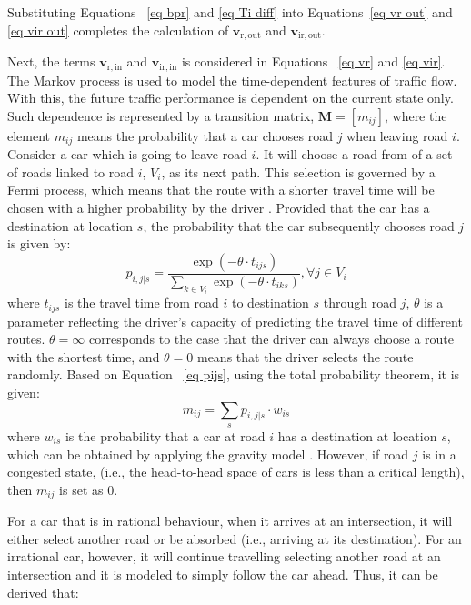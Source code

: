 \documentclass[review,11pt,nonatbib]{elsarticle}
\begin{document}
Substituting Equations ~\eqref{eq bpr} and \eqref{eq Ti diff} into Equations~\eqref{eq vr out} and \eqref{eq vir out} completes the calculation of $\mathbf{v}_{\mathrm{r,out}}$ and $\mathbf{v}_{\mathrm{ir,out}}$.
\par Next, the terms $\mathbf{v}_{\mathrm{r,in}}$ and $\mathbf{v}_{\mathrm{ir,in}}$ is considered in Equations ~\eqref{eq vr} and \eqref{eq vir}. The Markov process is used to model the time-dependent features of traffic flow. With this, the future traffic performance is dependent on the current state only. Such dependence is represented by a transition matrix, $\mathbf{M}=[m_{ij}]$, where the element $m_{ij}$ means the probability that a car chooses road $j$ when leaving road $i$.  Consider a car which is going to leave road $i$. It will choose a road from of a set of roads linked to road $i$, $V_i$, as its next path. This selection is governed by a Fermi process, which means that the route with a shorter travel time will be chosen with a higher probability by the driver \citep{lam1999stochastic,wu2010universality}. Provided that the car has a destination at location $s$, the probability that the car subsequently chooses road $j$ is given by:
\begin{equation}\label{eq pijs}
p_{i,j|s}=\frac{\exp(-\theta \cdot t_{ijs})}{\sum_{k\in V_i}\exp(-\theta\cdot t_{iks})}, \forall j\in V_i
\end{equation}
where $t_{ijs}$ is the travel time from road $i$ to destination $s$ through road $j$, $\theta$ is a parameter reflecting the driver's capacity of predicting the travel time of different routes. $\theta=\infty$ corresponds to the case that the driver can always choose a route with the shortest time, and $\theta=0$ means that the driver selects the route randomly. Based on Equation ~\eqref{eq pijs}, using the total probability theorem, it is given:
\begin{equation}\label{eq mij}
m_{ij}=\sum_{s} p_{i,j|s}\cdot w_{is}
\end{equation}
where $w_{is}$ is the probability that a car at road $i$ has a destination at location $s$, which can be obtained by applying the gravity model \citep{moriarty2007modeling,chang2012post}. However, if road $j$ is in a congested state, (i.e., the head-to-head space of cars is less than a critical length), then $m_{ij}$ is set as 0.
\par For a car that is in rational behaviour, when it arrives at an intersection, it will either select another road or be absorbed (i.e., arriving at its destination). For an irrational car, however, it will continue travelling selecting another road at an intersection and it is modeled to simply follow the car ahead. Thus, it can be derived that:
\end{document}

